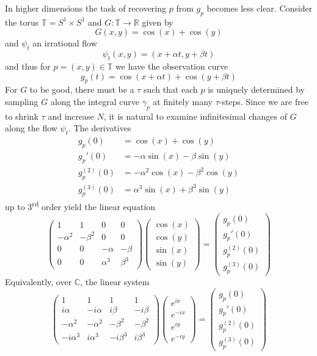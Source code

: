 \documentclass[11pt]{article}
\theoremstyle{definition}
\theoremstyle{remark}
\newcommand{\RR}{\mathbb{R}}
\newcommand{\CC}{\mathbb{C}}
\newcommand{\TT}{\mathbb{T}}
\newcommand{\ts}{\textsuperscript}
\begin{document}
    In higher dimensions the task of recovering $p$ from $g_p$ becomes less clear. Consider the torus $\TT = S^1\times S^1$ and $G:\TT \rightarrow \RR$ given by
    \[G(x,y) = \cos(x) + \cos(y)\]
    and $\psi_t$ an irrational flow
    \[\psi_t(x,y) = (x+\alpha t, y+ \beta t)\]
    and thus for $p = (x,y) \in \TT$ we have the observation curve
    \[g_p(t) = \cos(x+\alpha t) + \cos(y + \beta t) \]
    For $G$ to be good, there must be a $\tau$ such that each $p$ is uniquely determined by sampling $G$ along the integral curve $\gamma_p$ at finitely many $\tau$-steps. Since we are free to shrink $\tau$ and increase $N$, it is natural to examine infinitesimal changes of $G$ along the flow $\psi_t$. The derivatives
    \begin{align*}
    g_p(0) &= \cos(x) + \cos(y)\\
    g_p'(0) &= -\alpha\sin(x) - \beta\sin(y)\\
    g_p^{(2)}(0) &= -\alpha^2\cos(x) - \beta^2\cos(y)\\
    g_p^{(3)}(0) &= \alpha^3\sin(x) + \beta^3\sin(y)
    \end{align*}
    up to 3\ts{rd} order yield the linear equation
    \[\begin{pmatrix}1 & 1 & 0 & 0 \\ -\alpha^2 & -\beta^2 & 0 & 0 \\ 0 & 0 & -\alpha & -\beta \\ 0 & 0 & \alpha^3 & \beta^3\end{pmatrix}
    \begin{pmatrix} \cos(x) \\ \cos(y) \\ \sin(x) \\ \sin(y)\end{pmatrix} = \begin{pmatrix} g_p(0) \\ g_p'(0) \\ g_p^{(2)}(0) \\ g_p^{(3)}(0) \end{pmatrix} \]
    Equivalently, over $\CC$, the linear system
    \[\begin{pmatrix}1 & 1 & 1 & 1 \\ i\alpha & -i\alpha & i\beta & -i\beta \\ -\alpha^2 & -\alpha^2 & -\beta^2 & -\beta^2 \\ -i\alpha^3 & i\alpha^3 & -i\beta^3 & i\beta^3 \end{pmatrix}
    \begin{pmatrix} e^{ix} \\ e^{-ix} \\ e^{iy} \\ e^{-iy}\end{pmatrix} = \begin{pmatrix} g_p(0) \\ g_p'(0) \\ g_p^{(2)}(0) \\ g_p^{(3)}(0) \end{pmatrix} \]
\end{document}
